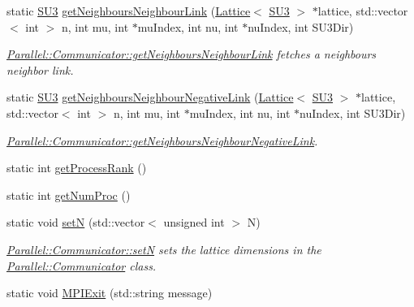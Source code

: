 \begin{DoxyCompactItemize}
static \mbox{\hyperlink{class_s_u3}{S\+U3}} \mbox{\hyperlink{class_parallel_1_1_communicator_a27862560cf6c7b8ccf650a422e014776}{get\+Neighbours\+Neighbour\+Link}} (\mbox{\hyperlink{class_lattice}{Lattice}}$<$ \mbox{\hyperlink{class_s_u3}{S\+U3}} $>$ $\ast$lattice, std\+::vector$<$ int $>$ n, int mu, int $\ast$mu\+Index, int nu, int $\ast$nu\+Index, int S\+U3\+Dir)
\begin{DoxyCompactList}\small\item\em \mbox{\hyperlink{class_parallel_1_1_communicator_a27862560cf6c7b8ccf650a422e014776}{Parallel\+::\+Communicator\+::get\+Neighbours\+Neighbour\+Link}} fetches a neighbours neighbor link. \end{DoxyCompactList}\item 
static \mbox{\hyperlink{class_s_u3}{S\+U3}} \mbox{\hyperlink{class_parallel_1_1_communicator_a1c598fae96e05e3b36db368e60453d63}{get\+Neighbours\+Neighbour\+Negative\+Link}} (\mbox{\hyperlink{class_lattice}{Lattice}}$<$ \mbox{\hyperlink{class_s_u3}{S\+U3}} $>$ $\ast$lattice, std\+::vector$<$ int $>$ n, int mu, int $\ast$mu\+Index, int nu, int $\ast$nu\+Index, int S\+U3\+Dir)
\begin{DoxyCompactList}\small\item\em \mbox{\hyperlink{class_parallel_1_1_communicator_a1c598fae96e05e3b36db368e60453d63}{Parallel\+::\+Communicator\+::get\+Neighbours\+Neighbour\+Negative\+Link}}. \end{DoxyCompactList}\item 
static int \mbox{\hyperlink{class_parallel_1_1_communicator_a474ab433da0e83ef372d74e26a7e5cb0}{get\+Process\+Rank}} ()
\item 
static int \mbox{\hyperlink{class_parallel_1_1_communicator_a7b1f80fb49a0cc83f2031c3415174150}{get\+Num\+Proc}} ()
\item 
static void \mbox{\hyperlink{class_parallel_1_1_communicator_a1db417babab93c8d8bf6339ff2bab540}{setN}} (std\+::vector$<$ unsigned int $>$ N)
\begin{DoxyCompactList}\small\item\em \mbox{\hyperlink{class_parallel_1_1_communicator_a1db417babab93c8d8bf6339ff2bab540}{Parallel\+::\+Communicator\+::setN}} sets the lattice dimensions in the \mbox{\hyperlink{class_parallel_1_1_communicator}{Parallel\+::\+Communicator}} class. \end{DoxyCompactList}\item 
static void \mbox{\hyperlink{class_parallel_1_1_communicator_a57bb28ee8dbc4efd708a2695423778c4}{M\+P\+I\+Exit}} (std\+::string message)

\end{DoxyCompactItemize}
